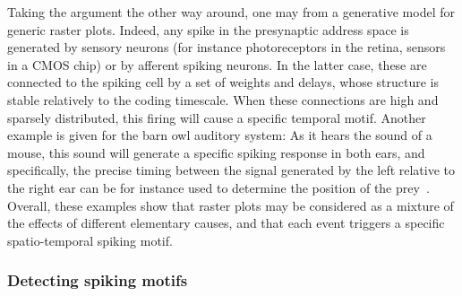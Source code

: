 \documentclass[default]{sn-jnl}%
\theoremstyle{thmstyleone}%
\theoremstyle{thmstyletwo}%
\theoremstyle{thmstylethree}%
\newcommand{\note}[1]{{\sethlcolor{yellow}\hl{#1}}}
\begin{document}

Taking the argument the other way around, one may from a generative model for generic raster plots. Indeed, any spike in the presynaptic address space is generated by sensory neurons (for instance photoreceptors in the retina, sensors in a CMOS chip) or by afferent spiking neurons. In the latter case, these are connected to the spiking cell by a set of weights and delays, whose structure is stable relatively to the coding timescale. When these connections are high and sparsely distributed, this firing will cause a specific temporal motif. Another example is given for the barn owl auditory system: As it hears the sound of a mouse, this sound will generate a specific spiking response in both ears, and specifically, the precise timing between the signal generated by the left relative to the right ear can be for instance used to determine the position of the prey~\citep{goodman_spike-timing-based_2010}. Overall, these examples show that raster plots may be considered as a mixture of the effects of different elementary causes, and that each event triggers a specific spatio-temporal spiking motif. 
%
\subsubsection{Detecting spiking motifs}
\end{document}
